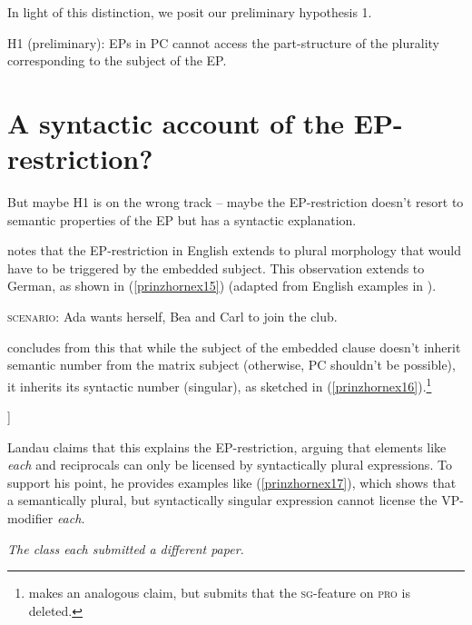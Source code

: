 \documentclass[output=paper,colorlinks,citecolor=brown,
]{langscibook}
\begin{document}
In light of this distinction, we posit our preliminary hypothesis 1.


\ea H1 (preliminary): EPs in PC cannot access the part-structure of the plurality corresponding to the subject of the EP.\label{prinzhornex14}
\z 




\section{A syntactic account of the EP-restriction?}\label{prinzhornsec:3}

But maybe H1 is on the wrong track -- maybe the EP-restriction doesn't resort to semantic properties of the EP but has a syntactic explanation. 

\cite{Landau:2000} notes that the EP-restriction in English extends to plural morphology that would have to be triggered by  the embedded subject. This observation extends to German, as shown in (\ref{prinzhornex15}) (adapted from English examples in \citealt{Landau:2000}).


\ea \label{prinzhornex15}
\ea \textsc{scenario:} Ada wants herself, Bea and Carl to join the club.
   \z\z



\cite{Landau:2000} concludes from this that while the subject of the embedded clause doesn't inherit semantic number from the matrix subject (otherwise, PC shouldn't be possible), it inherits its syntactic number (singular), as sketched in (\ref{prinzhornex16}).\footnote{\cite{Pearson:2016} makes an analogous claim, but submits that the \textsc{sg}-feature on \textsc{pro} is deleted. 
}

\ea [Ada$_{sg}$ plant [\textsc{pro}$_{sg}$ Mitglieder von diesem Verein zu werden]]\label{prinzhornex16}
\z

Landau claims that this explains the EP-restriction, arguing that elements like \textit{each} and reciprocals can only be licensed by syntactically plural expressions. To support his point, he provides  examples like (\ref{prinzhornex17}), which shows that a semantically plural, but syntactically singular expression cannot license the VP-modifier \textit{each}.


\ea * \textit{The class each submitted a different paper.} \phantom{.}\hfill \cite[49 (66d)]{Landau:2000} \label{prinzhornex17}
\z
\end{document}
